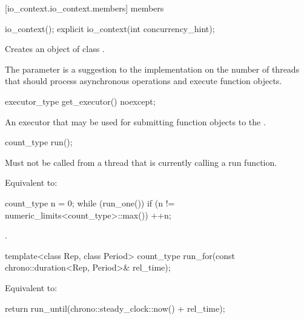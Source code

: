 [io_context.io_context.members]{ members}

%
\begin{itemdecl}
io_context();
explicit io_context(int concurrency_hint);
\end{itemdecl}

\begin{itemdescr}
\pnum
\effects Creates an object of class .

\pnum
\remarks The  parameter is a suggestion to the implementation on the number of threads that should process asynchronous operations and execute function objects.
\end{itemdescr}

%
\begin{itemdecl}
executor_type get_executor() noexcept;
\end{itemdecl}

\begin{itemdescr}
\pnum
\returns An executor that may be used for submitting function objects to the .
\end{itemdescr}

%
\begin{itemdecl}
count_type run();
\end{itemdecl}

\begin{itemdescr}
\pnum
\requires Must not be called from a thread that is currently calling a run function.

\pnum
\effects Equivalent to: 
\begin{codeblock}
count_type n = 0;
while (run_one())
  if (n != numeric_limits<count_type>::max())
    ++n;
\end{codeblock}


\pnum
\returns {}.
\end{itemdescr}

%
\begin{itemdecl}
template<class Rep, class Period>
  count_type run_for(const chrono::duration<Rep, Period>& rel_time);
\end{itemdecl}

\begin{itemdescr}
\pnum
\effects Equivalent to: 
\begin{codeblock}
return run_until(chrono::steady_clock::now() + rel_time);
\end{codeblock}

\end{itemdescr}

